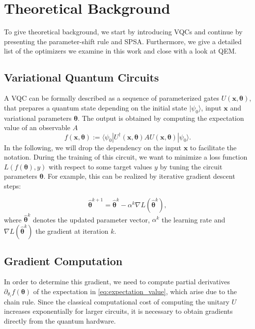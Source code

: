 \section{Theoretical Background}
\label{sec:Theory}
To give theoretical background, we start by introducing \glspl{VQC} and continue by presenting the parameter-shift rule and SPSA. Furthermore, we give a detailed list of the optimizers we examine in this work and close with a look at \gls{QEM}.

\subsection{Variational Quantum Circuits}
\label{sec:vqc}
A \gls{VQC} can be formally described as a sequence of parameterized gates $U(\bm{x}, \bm{\theta})$, that prepares a quantum state depending on the initial state $| \psi_0 \rangle$, input $\bm{x}$ and variational parameters $\bm{\theta}$. The output is obtained by computing the expectation value of an observable $A$ \cite{Schuld19}
\begin{equation}
\label{eq:expectation_value}
    f(\bm{x}, \bm{\theta}) := \langle \psi_0 | U^\dagger(\bm{x}, \bm{\theta}) A U(\bm{x}, \bm{\theta}) | \psi_0 \rangle .
\end{equation}
In the following, we will drop the dependency on the input $\bm{x}$ to facilitate the notation.
During the training of this circuit, we want to minimize a loss function $L(f(\bm{\theta}), y)$ with respect to some target values $y$ by tuning the circuit parameters $\bm{\theta}$. For example, this can be realized by iterative gradient descent steps:

\begin{equation}
\label{eq:gradient_step}
    \hat{\bm{\theta}}^{k+1} = \hat{\bm{\theta}}^k - \alpha^k \nabla L(\hat{\bm{\theta}}^k), %
\end{equation}
where $\hat{\bm{\theta}}^k$ denotes the updated parameter vector, $\alpha^k$ the learning rate and $\nabla L(\hat{\bm{\theta}}^k)$ the gradient at iteration $k$.  

\subsection{Gradient Computation}
\label{sec:gradient_estimation}
In order to determine this gradient, we need to compute partial derivatives $\partial_{\theta_i} f(\bm{\theta})$ of the expectation in \cref{eq:expectation_value}, which arise due to the chain rule. Since the classical computational cost of computing the unitary $U$ increases exponentially for larger circuits, it is necessary to obtain gradients directly from the quantum hardware.

